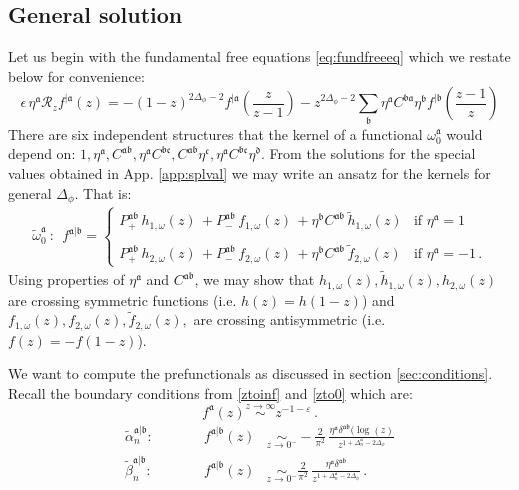 \documentclass[12pt]{article}
\numberwithin{equation}{section}
\newcommand{\be}{\begin{equation}}
\newcommand{\ee}{\end{equation}}
\newcommand{\ba}{\begin{equation}\begin{aligned}}
\newcommand{\ea}{\end{aligned}\end{equation}}
\newcommand{\Df}{{\Delta_\phi}}
\def\D{\Delta}
\newcommand{\mf}[1]{\mathfrak #1}
\begin{document}
	\subsection{General solution}
	
	Let us begin with the fundamental free equations \eqref{eq:fundfreeeq} which we restate below for convenience:
	\begin{equation}
	\label{eq:fundfreeeqApp}
	\epsilon\, \eta^{\mf a} \mathcal R_z f^{|\mf a}(z)=-(1-z)^{2\Df-2} f^{|\mf a}(\mbox{$\frac{z}{z-1}$})-z^{2\Df -2}\sum_{\mf b} \eta^{\mf a} C^{\mf b \mf a} \eta^{\mf b} f^{|\mf b}(\mbox{$\frac{z-1}{z}$})
	\end{equation}
	There are six independent structures that the kernel of a functional $\omega_0^{\mf a}$ would depend on: $1,\eta ^{\mf a}, C^{\mf a\mf b}, \eta^{\mf a}C^{\mf b\mf c}, C^{\mf a\mf b}\eta^{\mf c},\eta^{\mf a}C^{\mf b\mf c}\eta^{\mf d}$.  From the solutions  for the special values obtained in App. \ref{app:splval} we may write an ansatz for the kernels for general $\D_\phi$.  That is:
	\ba\label{ansatz}
	\tilde \omega_0^{\mf a} \ : \ \ f^{\mf a|\mf b} = \begin{cases}P^{\mf a \mf b}_+ \, h_{1,\omega}(z) \, + P^{\mf a \mf b}_- \, f_{1,\omega}(z) \, + \eta^{\mf b} C^{\mf a \mf b} \, \tilde h_{1,\omega}(z) & \text{if } \eta^{\mf a}=1\\ \\
		P^{\mf a \mf b}_+ \, h_{2,\omega}(z) \, + P^{\mf a \mf b}_- \, f_{2,\omega}(z) \, + \eta^{\mf b} C^{\mf a \mf b} \, \tilde f_{2,\omega}(z) & \text{if } \eta^{\mf a}=-1\,. \end{cases}
	\ea
	Using properties of $\eta^{\mf a}$ and $C^{\mf a\mf b}$, we may show that $h_{1,\omega}(z), \tilde h_{1,\omega}(z), h_{2,\omega}(z)$ are crossing symmetric functions (i.e. $h(z)=h(1-z)$) and $f_{1,\omega}(z),  f_{2,\omega}(z), \tilde f_{2,\omega}(z),$ are crossing antisymmetric (i.e. $f(z)=-f(1-z)$). 
	
	
	
	
	We want to compute the prefunctionals as discussed in section \ref{sec:conditions}. 
	Recall the  boundary conditions from \eqref{ztoinf} and \eqref{zto0} which are:
	\be\label{ztoinfApp}
	f^{\mf a}(z)\overset{z\to \infty}{\sim} z^{-1-\varepsilon}\,.
	\ee
	\ba\label{zto0App}
	\tilde \alpha_n^{\mf a|\mf b}:&\qquad&  f^{\mf a|\mf b}(z)&\underset{z\to 0^-}\sim -\frac{2}{\pi^2}\, \frac{\eta^{\mf a}\delta^{\mf a \mf b}(\log(z)}{z^{1+\Delta^{\mf a}_n-2\Df}}\\
	\tilde \beta_n^{\mf a|\mf b}:&\qquad& f^{\mf a|\mf b}(z)&\underset{z\to 0^-}\sim \frac{2}{\pi^2}\, \frac{\eta^{\mf a}\delta^{\mf a \mf b}}{z^{1+\Delta^{\mf a}_n-2\Df}}\,.
	\ea
	
\end{document}
